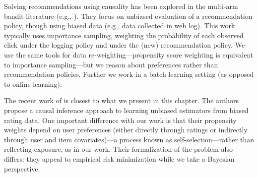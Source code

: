 


Solving recommendations using causality has been explored in the
multi-arm bandit literature (e.g.,
\cite{li2010contextual,vanchinathan14explore,zhao13interactive,li15counterfactual}).
They focus on unbiased evaluation of a recommendation policy, though
using biased data (e.g., data collected in web log). This work
typically uses importance sampling, weighting the probability of each
observed click under the logging policy and under the (new)
recommendation policy. We use the same tools for data
re-weighting---propensity score weighting is equivalent to importance
sampling---but we reason about preferences rather than recommendation
policies. Further we work in a batch learning setting (as opposed to
online learning).


The recent work of \citet{schnabel16treatment} is closest to what we present in this chapter. The
authors propose a causal inference approach to learning unbiased
estimators from biased rating data. One important difference with our
work is that their propensity weights depend on user preferences
(either directly through ratings or indirectly through user and item
covariates)---a process known as self-selection---rather than
reflecting exposure, as in our work. Their formalization of the
problem also differs: they appeal to empirical risk minimization while
we take a Bayesian perspective.




